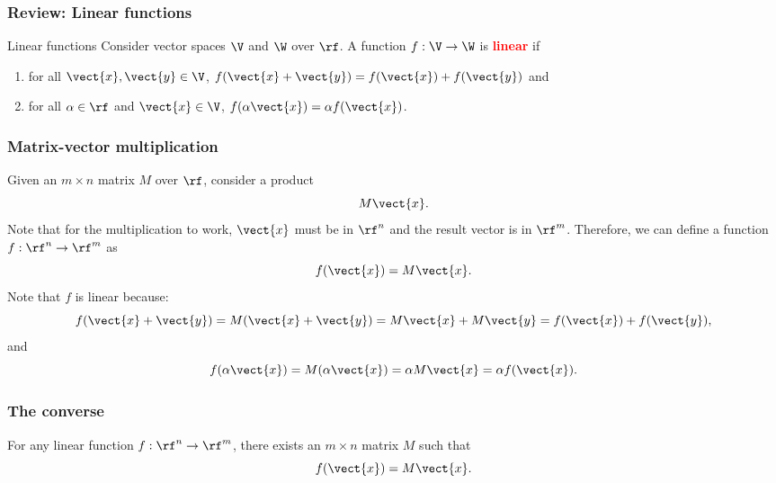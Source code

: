 


\begin{frame}
  \frametitle{Review: Linear functions}

  \begin{block}{Linear functions}
    Consider vector spaces $\V$ and $\W$ over $\rf$.  A function
    $f:\V\rightarrow\W$ is \textcolor{red}{\bf linear} if
    \begin{enumerate}
    \item for all $\vect{x},\vect{y}\in\V$,
      $f(\vect{x}+\vect{y})=f(\vect{x}) + f(\vect{y})$ and
    \item for all $\alpha\in\rf$ and $\vect{x}\in\V$,
      $f(\alpha\vect{x})=\alpha f(\vect{x})$.
    \end{enumerate}
  \end{block}
\end{frame}

\begin{frame}
  \frametitle{Matrix-vector multiplication}

  Given an $m\times n$ matrix $M$ over $\rf$, consider a product
  \[
  M\vect{x}.
  \]
  Note that for the multiplication to work, $\vect{x}$ must be in
  $\rf^n$ and the result vector is in $\rf^m$.  Therefore, we can define
  a function $f: \rf^n \rightarrow \rf^m$ as
  \[
  f(\vect{x}) = M\vect{x}.
  \]
  Note that $f$ is linear because:
  \[
  f(\vect{x}+\vect{y})=M(\vect{x}+\vect{y})=M\vect{x} + M\vect{y}=
  f(\vect{x})+f(\vect{y}),
  \]
  and
  \[
  f(\alpha\vect{x})=M(\alpha\vect{x})=\alpha M\vect{x} = \alpha f(\vect{x}).
  \]
\end{frame}

\begin{frame}
  \frametitle{The converse}
  \begin{lemma}
    For any linear function $f:\rf^n \rightarrow \rf^m$, there exists an
    $m\times n$ matrix $M$ such that
    \[
    f(\vect{x}) = M\vect{x}.
    \]
  \end{lemma}
\end{frame}

